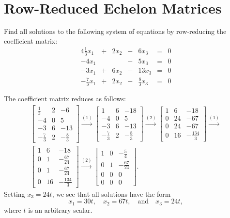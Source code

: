 \section{Row-Reduced Echelon Matrices}

 Find all solutions to the following system of equations by
row-reducing the coefficient matrix:
\begin{alignat*}{4}
  \tfrac13x_1 &{}+{}& 2x_2 &{}-{}& 6x_3 &{}={}& 0 \\
  -4x_1 && &{}+{}& 5x_3 &{}={}& 0 \\
  -3x_1 &{}+{}& 6x_2 &{}-{}& 13x_3 &{}={}& 0 \\
  -\tfrac73x_1 &{}+{}& 2x_2 &{}-{}& \tfrac83x_3 &{}={}& 0
\end{alignat*}
\begin{solution}
  The coefficient matrix reduces as follows:
  \begin{gather*}
    \begin{bmatrix}
      \frac13 & 2 & -6 \\[3pt]
      -4 & 0 & 5 \\[3pt]
      -3 & 6 & -13 \\[3pt]
      -\frac73 & 2 & -\frac83
    \end{bmatrix}
    \xrightarrow{(1)}
    \begin{bmatrix}
      1 & 6 & -18 \\[3pt]
      -4 & 0 & 5 \\[3pt]
      -3 & 6 & -13 \\[3pt]
      -\frac73 & 2 & -\frac83
    \end{bmatrix}
    \xrightarrow{(2)}
    \begin{bmatrix}
      1 & 6 & -18 \\[3pt]
      0 & 24 & -67 \\[3pt]
      0 & 24 & -67 \\[3pt]
      0 & 16 & -\frac{134}3
    \end{bmatrix}
    \xrightarrow{(1)} \\
    \begin{bmatrix}
      1 & 6 & -18 \\[3pt]
      0 & 1 & -\frac{67}{24} \\[3pt]
      0 & 1 & -\frac{67}{24} \\[3pt]
      0 & 16 & -\frac{134}3
    \end{bmatrix}
    \xrightarrow{(2)}
    \begin{bmatrix}
      1 & 0 & -\frac54 \\[3pt]
      0 & 1 & -\frac{67}{24} \\[3pt]
      0 & 0 & 0 \\[3pt]
      0 & 0 & 0
    \end{bmatrix}.
  \end{gather*}
  Setting $x_3 = 24t$, we see that all solutions have the form
  \begin{equation*}
    x_1 = 30t,
    \quad
    x_2 = 67t,
    \quad\text{and}\quad
    x_3 = 24t,
  \end{equation*}
  where $t$ is an arbitrary scalar.
\end{solution}

